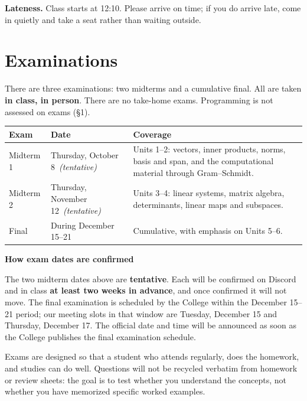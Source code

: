 \documentclass[11pt]{article}
\newenvironment{callout}[1]
  {\par\medskip\needspace{5\baselineskip}%
   \begin{lrbox}{\qcbox}%
   \begin{minipage}{\dimexpr\textwidth-2\fboxsep-4pt}%
   \setlength{\parskip}{0.4em}%
   \textbf{\color{accent}#1}\par}
  {\end{minipage}\end{lrbox}%
   \begin{center}\colorbox{softbg}{\usebox{\qcbox}}\end{center}\medskip}
\newcommand{\midtermone}{Thursday, October 8}
\newcommand{\midtermtwo}{Thursday, November 12}
\begin{document}
\textbf{Lateness.} Class starts at 12:10. Please arrive on time; if you do
arrive late, come in quietly and take a seat rather than waiting outside.

\section{Examinations}

There are three examinations: two midterms and a cumulative final. All are
taken \textbf{in class, in person}. There are no take-home exams. Programming
is not assessed on exams (\S1).

\begin{center}
\renewcommand{\arraystretch}{1.3}
\begin{tabular}{@{} l l >{\raggedright\arraybackslash}p{7.4cm} @{}}
\toprule
\textbf{Exam} & \textbf{Date} & \textbf{Coverage} \\
\midrule
Midterm 1 & \midtermone\ \emph{(tentative)}
  & Units 1--2: vectors, inner products, norms, basis and span, and the
    computational material through Gram--Schmidt. \\
Midterm 2 & \midtermtwo\ \emph{(tentative)}
  & Units 3--4: linear systems, matrix algebra, determinants, linear maps and
    subspaces. \\
Final     & During December 15--21
  & Cumulative, with emphasis on Units 5--6. \\
\bottomrule
\end{tabular}
\end{center}

\begin{callout}{How exam dates are confirmed}
The two midterm dates above are \textbf{tentative}. Each will be confirmed on
Discord and in class \textbf{at least two weeks in advance}, and once confirmed
it will not move. The final examination is scheduled by the College within the
December 15--21 period; our meeting slots in that window are Tuesday,
December 15 and Thursday, December 17. The official date and time will be
announced as soon as the College publishes the final examination schedule.
\end{callout}

Exams are designed so that a student who attends regularly, does the homework,
and studies can do well. Questions will not be recycled verbatim from homework
or review sheets: the goal is to test whether you understand the concepts, not
whether you have memorized specific worked examples.
\end{document}
